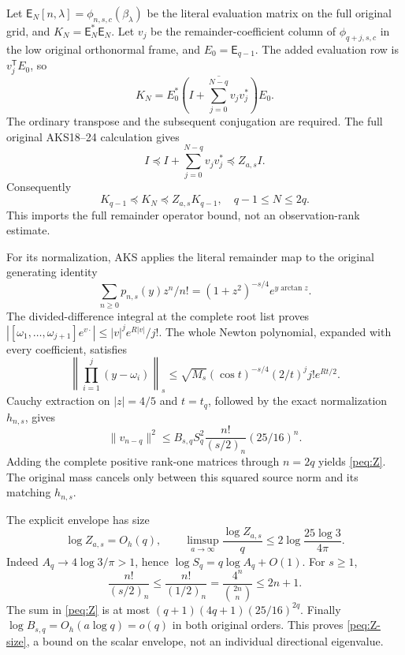 \documentclass[11pt,a4paper]{article}
\begin{document}
Let $\mathsf E_N[n,\lambda]=\phi_{n,s,c}(\beta_\lambda)$ be the literal evaluation matrix on the full original grid, and $K_N=\mathsf E_N^*\mathsf E_N$. Let $v_j$ be the remainder-coefficient column of $\phi_{q+j,s,c}$ in the low original orthonormal frame, and $E_0=\mathsf E_{q-1}$. The added evaluation row is $v_j^{\mathsf T}E_0$, so
\begin{equation}
 K_N=E_0^*\overline{\left(I+\sum_{j=0}^{N-q}v_jv_j^*\right)}E_0.
 \label{peq:numgram}
\end{equation}
The ordinary transpose and the subsequent conjugation are required. The full original AKS18--24 calculation gives
\[
 I\preceq I+\sum_{j=0}^{N-q}v_jv_j^*\preceq Z_{a,s}I.
\]
Consequently
\begin{equation}
 \boxed{K_{q-1}\preceq K_N\preceq Z_{a,s}K_{q-1},
                  \quad q-1\le N\le2q.}\label{peq:num-bound}
\end{equation}
This imports the full remainder operator bound, not an observation-rank estimate.

For its normalization, AKS applies the literal remainder map to the original generating identity
\[
 \sum_{n\ge0}p_{n,s}(y)z^n/n!
       =(1+z^2)^{-s/4}e^{y\arctan z}.
\]
The divided-difference integral at the complete root list proves
$|[\omega_1,\ldots,\omega_{j+1}]e^{v\cdot}|\le |v|^je^{R|v|}/j!$.
The whole Newton polynomial, expanded with every coefficient, satisfies
\[
 \left\|\prod_{i=1}^j(y-\omega_i)\right\|_s
 \le\sqrt{M_s}(\cos t)^{-s/4}(2/t)^j j!e^{Rt/2}.
\]
Cauchy extraction on $|z|=4/5$ and $t=t_q$, followed by the exact normalization $h_{n,s}$, gives
\[
 \|v_{n-q}\|^2\le
 B_{s,q}S_q^2\frac{n!}{(s/2)_n}(25/16)^n.
\]
Adding the complete positive rank-one matrices through $n=2q$ yields \eqref{peq:Z}. The original mass cancels only between this squared source norm and its matching $h_{n,s}$.

The explicit envelope has size
\begin{equation}
 \log Z_{a,s}=O_h(q),\qquad
 \limsup_{a\to\infty}\frac{\log Z_{a,s}}q
 \le2\log\frac{25\log3}{4\pi}.
 \label{peq:Z-size}
\end{equation}
Indeed $A_q\to4\log3/\pi>1$, hence $\log S_q=q\log A_q+O(1)$. For $s\ge1$,
\[
 \frac{n!}{(s/2)_n}\le\frac{n!}{(1/2)_n}
 =\frac{4^n}{\binom{2n}{n}}\le2n+1.
\]
The sum in \eqref{peq:Z} is at most $(q+1)(4q+1)(25/16)^{2q}$. Finally $\log B_{s,q}=O_h(a\log q)=o(q)$ in both original orders. This proves \eqref{peq:Z-size}, a bound on the scalar envelope, not an individual directional eigenvalue.
\end{document}

